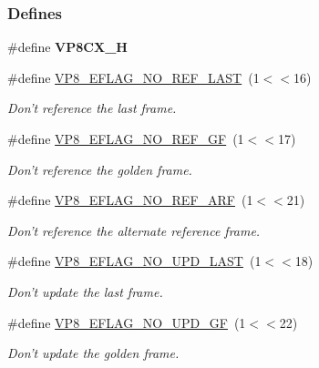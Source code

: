 \subsubsection*{\-Defines}
\begin{DoxyCompactItemize}
\item 
\hypertarget{group__vp8__encoder_gae0ac779c2d78f39ad22df9f9f246d1fa}{
\#define {\bfseries \-V\-P8\-C\-X\-\_\-\-H}}
\label{group__vp8__encoder_gae0ac779c2d78f39ad22df9f9f246d1fa}

\item 
\#define \hyperlink{group__vp8__encoder_gafb51c67e5743275146bc1fc425727da3}{\-V\-P8\-\_\-\-E\-F\-L\-A\-G\-\_\-\-N\-O\-\_\-\-R\-E\-F\-\_\-\-L\-A\-S\-T}~(1$<$$<$16)
\begin{DoxyCompactList}\small\item\em \-Don't reference the last frame. \end{DoxyCompactList}\item 
\#define \hyperlink{group__vp8__encoder_gabb5e95343a2738abef44eca13059da33}{\-V\-P8\-\_\-\-E\-F\-L\-A\-G\-\_\-\-N\-O\-\_\-\-R\-E\-F\-\_\-\-G\-F}~(1$<$$<$17)
\begin{DoxyCompactList}\small\item\em \-Don't reference the golden frame. \end{DoxyCompactList}\item 
\#define \hyperlink{group__vp8__encoder_ga650ab0baea12be91082226a5cc18776a}{\-V\-P8\-\_\-\-E\-F\-L\-A\-G\-\_\-\-N\-O\-\_\-\-R\-E\-F\-\_\-\-A\-R\-F}~(1$<$$<$21)
\begin{DoxyCompactList}\small\item\em \-Don't reference the alternate reference frame. \end{DoxyCompactList}\item 
\#define \hyperlink{group__vp8__encoder_ga602edb6b02a89cb2db7a16d6dffba583}{\-V\-P8\-\_\-\-E\-F\-L\-A\-G\-\_\-\-N\-O\-\_\-\-U\-P\-D\-\_\-\-L\-A\-S\-T}~(1$<$$<$18)
\begin{DoxyCompactList}\small\item\em \-Don't update the last frame. \end{DoxyCompactList}\item 
\#define \hyperlink{group__vp8__encoder_gab01d066c5236457d345ce1cab4c41d6b}{\-V\-P8\-\_\-\-E\-F\-L\-A\-G\-\_\-\-N\-O\-\_\-\-U\-P\-D\-\_\-\-G\-F}~(1$<$$<$22)
\begin{DoxyCompactList}\small\item\em \-Don't update the golden frame. \end{DoxyCompactList}\item 
$$
\end{DoxyCompactItemize}
